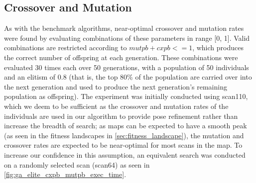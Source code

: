 \documentclass[authoryearcitations]{UoYCSproject}
\begin{document}
\subsection{Crossover and Mutation}
\label{subsec:elite_cxpb_mupb}
As with the benchmark algorithms, near-optimal crossover and mutation rates were found by evaluating combinations of these parameters in range [0, 1]. Valid combinations are restricted according to $mutpb + cxpb <= 1$, which produces the correct number of offspring at each generation. These combinations were evaluated 30 times each over 50 generations, with a population of 50 individuals and an elitism of 0.8 (that is, the top 80\% of the population are carried over into the next generation and used to produce the next generation's remaining population as offspring). The experiment was initially conducted using scan110, which we deem to be sufficient as the crossover and mutation rates of the individuals are used in our algorithm to provide pose refinement rather than increase the breadth of search; as maps can be expected to have a smooth peak (as seen in the fitness landscapes in \autoref{sec:fitness_landscape}), the mutation and crossover rates are expected to be near-optimal for most scans in the map. To increase our confidence in this assumption, an equivalent search was conducted on a randomly selected scan (scan64) as seen in \autoref{fig:ga_elite_cxpb_mutpb_exec_time}.
\end{document}
